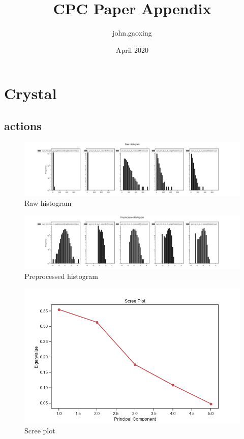 \documentclass{article}
\title{CPC Paper Appendix}
\author{john.gaoxing }
\date{April 2020}
\begin{document}
\section{Crystal}

\subsection{actions}

\begin{figure}[H]
    \centering
    \includegraphics[width=1\columnwidth]{Crystal/actions_logtransform_zNonepca2k4/Raw Histogram.png}
    \caption{Raw histogram}
    \label{fig:Crystalactionsrawhistogram}
\end{figure}
\begin{figure}[H]
    \centering
    \includegraphics[width=1\columnwidth]{Crystal/actions_logtransform_zNonepca2k4/Preprocessed Histogram.png}
    \caption{Preprocessed histogram}
    \label{fig:Crystalactionspreprocessedhistogram}
\end{figure}
\begin{figure}[H]
    \centering
    \includegraphics[width=1\columnwidth]{Crystal/actions_logtransform_zNonepca2k4/Scree Plot.png}
    \caption{Scree plot}
    \label{fig:Crystalactionsscreeplot}
\end{figure}
\end{document}
